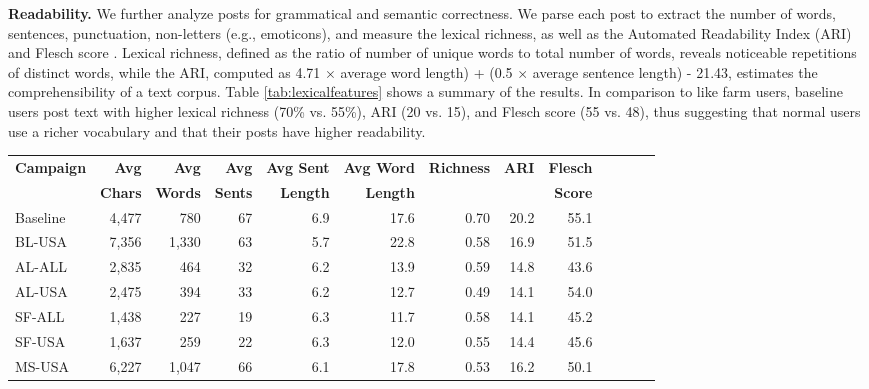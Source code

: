 \documentclass[twocolumn,10pt,letterpaper]{article}
\newcommand{\descr}[1]{\smallskip\noindent\textbf{#1}}
\begin{document}
\descr{Readability.} We further analyze posts for grammatical and semantic correctness. We parse each post to extract the number of words, sentences, punctuation, non-letters (e.g., emoticons), and measure the lexical richness, as well as the Automated Readability Index (ARI)~\cite{smith:ari} and Flesch score \cite{flesch48readability}. Lexical richness, defined as the ratio of number of unique words to total number of words, reveals noticeable repetitions of distinct words, while the ARI, computed as 4.71 $\times$ average word length) + (0.5 $\times$ average sentence length) - 21.43, estimates the comprehensibility of a text corpus. Table \ref{tab:lexicalfeatures} shows a summary of the results. In comparison to like farm users, baseline users post text with higher lexical richness (70\% vs. 55\%), ARI (20 vs. 15), and Flesch score (55 vs. 48), thus suggesting that normal users use a richer vocabulary and that their posts have higher readability.


\begin{table*}[!t]
\begin{center}
\small
\tabcolsep=0.12cm
%
\begin{tabular}{lrrrrrrrrrrrr}
\toprule
{\bf Campaign}&  	\bf Avg 	& \bf Avg & \bf Avg & {\bf Avg Sent} & {\bf Avg Word}  & {\bf Richness} & {\bf ARI}  & {\bf Flesch}\\
 &  {\bf Chars}	&  {\bf Words}	& {\bf Sents} &  {\bf Length}  & {\bf Length} & & & {\bf Score}\\
\midrule
Baseline	&	4,477	&	780	&	67	&	6.9	&	17.6	&	0.70	&	20.2	&	55.1	\\
\midrule

BL-USA	&	7,356	&	1,330	&	63	&	5.7	&	22.8	&	0.58	&	16.9	&	51.5	\\
AL-ALL	&	2,835	&	464	&	32	&	6.2	&	13.9	&	0.59	&	14.8	&	43.6	\\
AL-USA	&	2,475	&	394	&	33	&	6.2	&	12.7	&	0.49	&	14.1	&	54.0	\\
%
%
%
%
%
%
%
SF-ALL	&	1,438	&	227	&	19	&	6.3	&	11.7	&	0.58	&	14.1	&	45.2	\\
SF-USA	&	1,637	&	259	&	22	&	6.3	&	12.0	&	0.55	&	14.4	&	45.6	\\
MS-USA	&	6,227	&	1,047	&	66	&	6.1	&	17.8	&	0.53	&	16.2	&	50.1	\\
%
%
%
\bottomrule
\end{tabular}
%
\vspace{-0.15cm}
\caption{Lexical analysis of timeline posts.}
\label{tab:lexicalfeatures}		
\end{center}
\end{table*}
\end{document}
